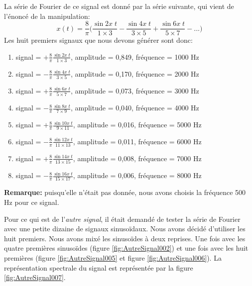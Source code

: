 \documentclass[a4paper]{article}
\begin{document}
La série de Fourier de ce signal est donné par la série suivante, qui vient de l'énoncé de la manipulation:
\[ x(t) = \frac{8}{\pi} \bigg( \frac{\sin 2 x \; t}{1 \times 3} - \frac{\sin 4 x \; t}{3 \times 5} + \frac{\sin 6 x \; t}{5 \times 7} - ... \bigg) \]
Les huit premiers signaux que nous devons générer sont donc:
\begin{enumerate}
    \item signal = $\displaystyle +\frac{8}{\pi} \frac{\sin 2 x \; t}{1 \times 3} $, amplitude = 0,849, fréquence = 1000 Hz
    \item signal = $\displaystyle -\frac{8}{\pi} \frac{\sin 4 x \; t}{3 \times 5} $, amplitude = 0,170, fréquence = 2000 Hz
    \item signal = $\displaystyle +\frac{8}{\pi} \frac{\sin 6 x \; t}{5 \times 7} $, amplitude = 0,073, fréquence = 3000 Hz
    \item signal = $\displaystyle -\frac{8}{\pi} \frac{\sin 8 x \; t}{7 \times 9} $, amplitude = 0,040, fréquence = 4000 Hz

    \item signal = $\displaystyle +\frac{8}{\pi} \frac{\sin 10 x \; t}{9 \times 11} $, amplitude = 0,016, fréquence = 5000 Hz
    \item signal = $\displaystyle -\frac{8}{\pi} \frac{\sin 12 x \; t}{11 \times 13} $, amplitude = 0,011, fréquence = 6000 Hz
    \item signal = $\displaystyle +\frac{8}{\pi} \frac{\sin 14 x \; t}{13 \times 15} $, amplitude = 0,008, fréquence = 7000 Hz
    \item signal = $\displaystyle -\frac{8}{\pi} \frac{\sin 16 x \; t}{15 \times 17} $, amplitude = 0,006, fréquence = 8000 Hz
\end{enumerate}
\textbf{Remarque:} puisqu'elle n'était pas donnée, nous avons choisis la fréquence 500 Hz pour ce signal.






Pour ce qui est de l'\textit{autre signal}, il était demandé de tester la série de Fourier avec une petite dizaine de signaux sinusoïdaux. Nous avons décidé d'utiliser les huit premiers. Nous avons mixé les sinusoïdes à deux reprises. Une fois avec les quatre premières sinusoïdes (figure \ref{fig:AutreSignal002}) et une fois avec les huit premières (figure \ref{fig:AutreSignal005} et figure \ref{fig:AutreSignal006}). La représentation spectrale du signal est représentée par la figure \ref{fig:AutreSignal007}.
\end{document}
